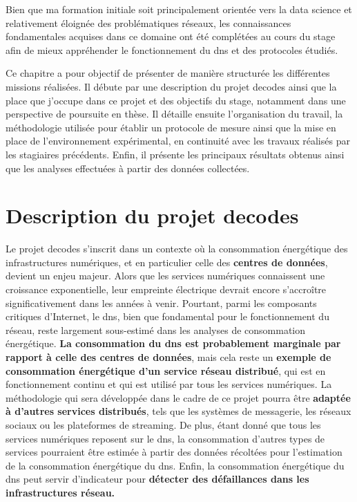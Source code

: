 \documentclass[12pt, a4paper]{report}
\begin{document}
	Bien que ma formation initiale soit principalement orientée vers la data science et relativement éloignée des problématiques réseaux, les connaissances fondamentales acquises dans ce domaine ont été complétées au cours du stage afin de mieux appréhender le fonctionnement du \gls{dns} et des protocoles étudiés.

	Ce chapitre a pour objectif de présenter de manière structurée les différentes missions réalisées. Il débute par une description du projet \gls{decodes} ainsi que la place que j'occupe dans ce projet et des objectifs du stage, notamment dans une perspective de poursuite en thèse. Il détaille ensuite l'organisation du travail, la méthodologie utilisée pour établir un protocole de mesure ainsi que la mise en place de l'environnement expérimental, en continuité avec les travaux réalisés par les stagiaires précédents. Enfin, il présente les principaux résultats obtenus ainsi que les analyses effectuées à partir des données collectées.

	\section{Description du projet \gls{decodes}}
	\label{sec:projet_decodes}

	Le projet \gls{decodes} s'inscrit dans un contexte où la consommation énergétique des infrastructures numériques, et en particulier celle des \textbf{centres de données}, devient un enjeu majeur. Alors que les services numériques connaissent une croissance exponentielle, leur empreinte électrique devrait encore s'accroître significativement dans les années à venir. Pourtant, parmi les composants critiques d'Internet, le \gls{dns}, bien que fondamental pour le fonctionnement du réseau, reste largement sous-estimé dans les analyses de consommation énergétique. \textbf{La consommation du \gls{dns} est probablement marginale par rapport à celle des centres de données}, mais cela reste un \textbf{exemple de consommation énergétique d'un service réseau distribué}, qui est en fonctionnement continu et qui est utilisé par tous les services numériques. La méthodologie qui sera développée dans le cadre de ce projet pourra être \textbf{adaptée à d'autres services distribués}, tels que les systèmes de messagerie, les réseaux sociaux ou les plateformes de streaming. De plus, étant donné que tous les services numériques reposent sur le \gls{dns}, la consommation d'autres types de services pourraient être estimée à partir des données récoltées pour l'estimation de la consommation énergétique du \gls{dns}. Enfin, la consommation énergétique du \gls{dns} peut servir d'indicateur pour \textbf{détecter des défaillances dans les infrastructures réseau.}
\end{document}
